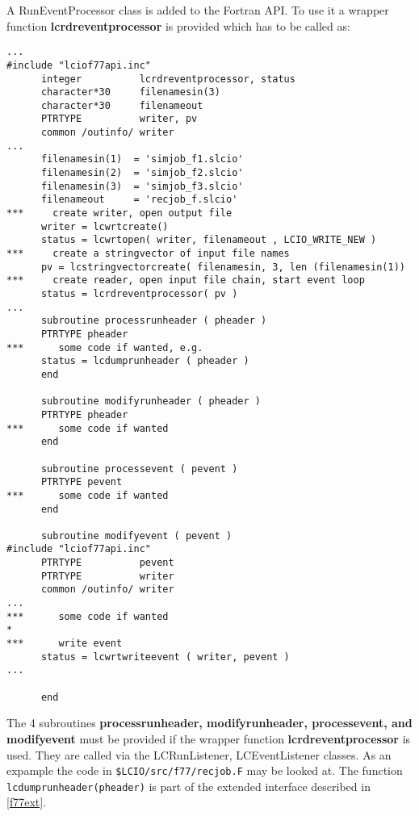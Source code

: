 A RunEventProcessor class is added to the Fortran API. To use it a wrapper function {\bf lcrdreventprocessor}
is provided which has to be called as:
\begin{verbatim}
...
#include "lciof77api.inc"
      integer          lcrdreventprocessor, status
      character*30     filenamesin(3)
      character*30     filenameout
      PTRTYPE          writer, pv
      common /outinfo/ writer
...
      filenamesin(1)  = 'simjob_f1.slcio'
      filenamesin(2)  = 'simjob_f2.slcio'
      filenamesin(3)  = 'simjob_f3.slcio'
      filenameout     = 'recjob_f.slcio'
***     create writer, open output file
      writer = lcwrtcreate()
      status = lcwrtopen( writer, filenameout , LCIO_WRITE_NEW )
***     create a stringvector of input file names
      pv = lcstringvectorcreate( filenamesin, 3, len (filenamesin(1))
***     create reader, open input file chain, start event loop
      status = lcrdreventprocessor( pv )
...
      subroutine processrunheader ( pheader )
      PTRTYPE pheader
***      some code if wanted, e.g.
      status = lcdumprunheader ( pheader )
      end

      subroutine modifyrunheader ( pheader )
      PTRTYPE pheader
***      some code if wanted
      end

      subroutine processevent ( pevent )
      PTRTYPE pevent
***      some code if wanted
      end

      subroutine modifyevent ( pevent )
#include "lciof77api.inc"
      PTRTYPE          pevent
      PTRTYPE          writer
      common /outinfo/ writer
...
***      some code if wanted
*
***      write event
      status = lcwrtwriteevent ( writer, pevent )
...

      end
\end{verbatim}

The 4 subroutines {\bf processrunheader, modifyrunheader, processevent, and modifyevent} must be provided if
the wrapper function {\bf lcrdreventprocessor} is used. They are called via the LCRunListener, LCEventListener classes.
As an expample the code in \verb#$LCIO/src/f77/recjob.F# may be looked at. 
The function \verb$lcdumprunheader(pheader)$ is part of the extended interface described in \ref{f77ext}.

